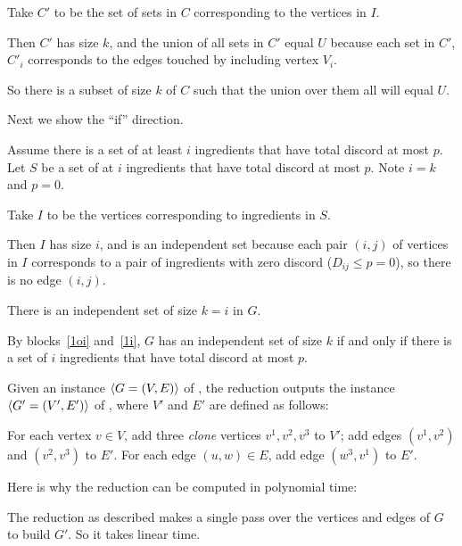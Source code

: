 \documentclass[11pt]{article}
\begin{document}
\begin{problems}
\begin{longFormProof}
\begin{block}[1oi]
      \step Take $C'$ to be the set of sets in $C$ corresponding to the vertices in $I$.

      \step Then $C'$ has size $k$, and the union of all sets in $C'$ equal $U$
              because each set in $C'$, $C'_i$ corresponds to the edges touched by including vertex $V_i$.

      \smallskip 
      \step So there is a subset of size $k$ of $C$ such that the union over them all will equal $U$.
    \end{block} 
    \step Next we show the ``if'' direction.
    \begin{block}[1i]
      {Assume there is a set of at least $i$ ingredients that have total discord at most $p$.}
      \step Let $S$ be a set of at $i$ ingredients that have total discord at most $p$.  Note $i=k$ and $p=0$.
      \smallskip 

      \step Take $I$ to be the vertices corresponding to ingredients in $S$.

      \step Then $I$ has size $i$, and is an independent set because
      each pair $(i,j)$ of vertices in $I$ corresponds to a pair of ingredients
      with zero discord ($D_{ij}\le p=0$), so there is no edge $(i,j)$.

      \smallskip 
      \step There is an independent set of size $k=i$ in $G$. 
    \end{block} 
    \step By blocks~\ref{1oi} and~\ref{1i},
    $G$ has an independent set of size $k$
    if and only if there is a set of $i$ ingredients that have total discord at most $p$.
  \end{longFormProof}

  \newpage
  \problem %

  Given an instance $\langle G=(V,E) \rangle$ of ,
  the reduction outputs the instance $\langle G'=(V',E') \rangle$ of ,
  where $V'$ and $E'$ are defined as follows:

  \lineacross 
  For each vertex $v\in V$, add three \emph{clone} vertices $v^1, v^2, v^3$ to $V'$;
  add edges $(v^1,v^2)$ and $(v^2, v^3)$ to $E'$.
  For each edge $(u,w) \in E$, add edge $(w^3, v^1)$ to $E'$.
  \lineacross 

  \medskip 
  Here is why the reduction can be computed in polynomial time:

  \lineacross 
  The reduction as described makes a single pass over the vertices and edges
  of $G$ to build $G'$.  So it takes linear time.
  \lineacross 


\end{problems}
\end{document}

